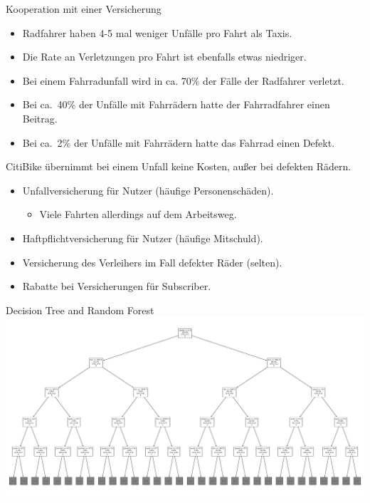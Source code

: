\begin{frame}{Kooperation mit einer Versicherung}
{
\begin{itemize}
\item Radfahrer haben 4-5 mal weniger Unfälle pro Fahrt als Taxis.
\item Die Rate an Verletzungen pro Fahrt ist ebenfalls etwas niedriger.
\item Bei einem Fahrradunfall wird in ca. 70\% der Fälle der Radfahrer verletzt.
\item Bei ca.\ 40\% der Unfälle mit Fahrrädern hatte der Fahrradfahrer einen Beitrag.
\item Bei ca.\ 2\% der Unfälle mit Fahrrädern hatte das Fahrrad einen Defekt.
\end{itemize}
}
{
CitiBike übernimmt bei einem Unfall keine Kosten, außer bei defekten Rädern.
\begin{itemize}
\item Unfallversicherung für Nutzer (häufige Personenschäden).
\begin{itemize}
\item Viele Fahrten allerdings auf dem Arbeitsweg.
\end{itemize}
\item Haftpflichtversicherung für Nutzer (häufige Mitschuld).
\item Versicherung des Verleihers im Fall defekter Räder (selten).
\item Rabatte bei Versicherungen für Subscriber.
\end{itemize}
}
\end{frame}

\begin{frame}{Decision Tree and Random Forest}
\includegraphics[width=\textwidth]{../Images/ExampleTree}
\end{frame}






